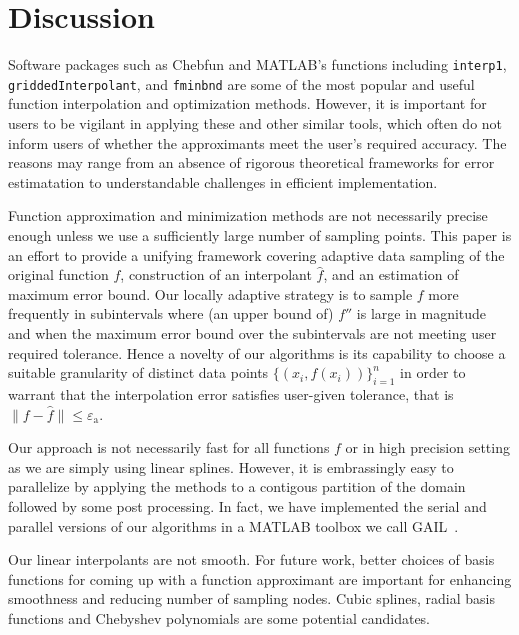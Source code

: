 \documentclass[review]{elsarticle}
\newcommand{\abstol}{\varepsilon_{\textrm{a}}}
\theoremstyle{definition}
\begin{document}
 



\section{Discussion}

Software packages such as Chebfun and MATLAB's functions including \texttt{interp1},
\texttt{griddedInterpolant}, and \texttt{fminbnd} are some of the most popular
and useful function interpolation and optimization methods. However, it is
important for users to be vigilant in applying these and other similar tools, which 
often do not inform users of whether the approximants meet the user's
required accuracy. The reasons may range from an absence of rigorous theoretical
frameworks for error estimatation to understandable challenges in efficient
implementation. 

Function approximation and minimization methods are not necessarily precise
enough unless we use a sufficiently large number of sampling points. This paper
is an effort to provide a unifying framework covering adaptive data sampling of
the original function $f$, construction of an interpolant $\hat{f}$, and an
estimation of maximum error bound. Our locally adaptive strategy is to sample
$f$ more frequently in subintervals where (an upper bound of) $f''$ is large in
magnitude and when the maximum error bound over the subintervals are not meeting
user required tolerance. Hence a novelty of our algorithms is its capability to
choose a suitable granularity of distinct data points $\{(x_i,
f(x_i))\}_{i=1}^n$ in order to warrant that the interpolation error satisfies
user-given tolerance, that is $\| f - \hat{f} \| \le \abstol$.

Our approach is not necessarily fast for all functions $f$ or in high precision
setting as we are simply using linear splines. However, it is embrassingly easy
to parallelize by applying the methods to a contigous partition of the domain
followed by some post processing. In fact, we have implemented the serial and
parallel versions of our algorithms in a MATLAB toolbox we call
GAIL~\cite{ChoEtal15a}.


Our linear interpolants are not smooth. For future work, better choices of basis
functions for coming up with a function approximant are important for enhancing
smoothness and reducing number of sampling nodes. Cubic splines, radial basis
functions and Chebyshev polynomials are some potential candidates.




\end{document}
